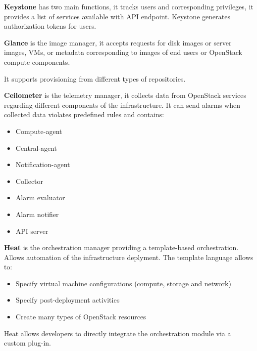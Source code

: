 \textbf{Keystone} has two main functions, it tracks users and corresponding privileges, it provides
a list of services available with API endpoint. Keystone generates authorization tokens for users.

\textbf{Glance} is the image manager, it accepts requests for disk images or server images, VMs, or metadata corresponding to images of end users or OpenStack compute components.

It supports provisioning from different types of repositories.

\textbf{Ceilometer} is the telemetry manager, it collects data from OpenStack services regarding different components of the infrastructure. It can send alarms when collected data violates predefined rules and contains:
\begin{itemize}
    \item Compute-agent
    \item Central-agent
    \item Notification-agent
    \item Collector
    \item Alarm evaluator
    \item Alarm notifier
    \item API server
\end{itemize}

\textbf{Heat} is the orchestration manager providing a template-based orchestration. Allows automation of the infrastructure deplyment. The template language allows to:
\begin{itemize}
    \item Specify virtual machine configurations (compute, storage and network)
    \item Specify post-deployment activities
    \item Create many types of OpenStack resources
\end{itemize}
Heat allows developers to directly integrate the orchestration module via a custom plug-in.

